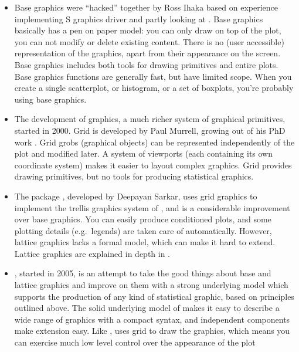 \begin{itemize} 
  \item Base graphics were ``hacked'' together by Ross Ihaka based on experience implementing S graphics driver and partly looking at \cite{chambers:1983}.  Base graphics basically has a pen on paper model: you can only draw on top of the plot, you can not modify or delete existing content.  There is no (user accessible) representation of the graphics, apart from their appearance on the screen. Base graphics includes both tools for drawing primitives and entire plots.  Base graphics functions are generally fast, but have limited scope. When you create a single scatterplot, or histogram, or a set of boxplots, you're probably using base graphics.

  \item The development of  graphics, a much richer system of graphical primitives, started in 2000.  Grid is developed by Paul Murrell, growing out of his PhD work \citep{murrell:1998}. Grid grobs (graphical objects) can be represented independently of the plot and modified later. A system of viewports (each containing its own coordinate system) makes it easier to layout complex graphics. Grid provides drawing primitives, but no tools for producing statistical graphics.  

  \item The  package \citep{lattice}, developed by Deepayan Sarkar, uses grid graphics to implement the trellis graphics system of \citet{cleveland:1993,cleveland:1994}, and is a considerable improvement over base graphics.  You can easily produce conditioned plots, and some plotting details (e.g.\ legends) are taken care of automatically.  However, lattice graphics lacks a formal model, which can make it hard to extend.  Lattice graphics are explained in depth in \citep{sarkar:2008}.

  \item \ggplot, started in 2005, is an attempt to take the good things about base and lattice graphics and improve on them with a strong underlying model which supports the production of any kind of statistical graphic, based on principles outlined above.  The solid underlying model of \ggplot makes it easy to describe a wide range of graphics with a compact syntax, and independent components make extension easy.  Like , \ggplot uses grid to draw the graphics, which means you can exercise much low level control over the appearance of the plot

\end{itemize}

